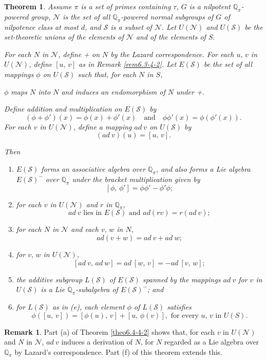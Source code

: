 \documentclass[mathscr]{amsart}
\theoremstyle{theorem}
\newtheorem{theorem}{Theorem}[section]
\theoremstyle{definition}
\newtheorem*{remarknn}{Remark}
\numberwithin{equation}{section}
\def \({\left(}
\def \){\right)}
\def\Q{\mathbb{Q}}
\def\S{\mathcal{S}}
\begin{document}
\begin{theorem}\label{theo6.6}
Assume $\pi$ is a set of primes containing $\tau$, $G$ is a
nilpotent $\Q_\pi$-powered group, $\mathcal{N}$ is the set of all
$\Q_\pi$-powered normal subgroups of $G$ of nilpotence class at most
$d$, and $\S$ is a subset of $\mathcal{N}$. Let $U(\mathcal{N})$ and
$U(\S)$ be the set-theoretic unions of the elements of $\mathcal{N}$
and of the elements of $S.$

For each $N$ in $\mathcal{N}$, define + on $N$ by the Lazard
correspondence. For each $u,\,v$ in $U(\mathcal{N})$, define
$[u,\,v]$ as in Remark \ref{rem6.3-4-2}. Let $E(\S)$ be the set of
all mappings $\phi$ on $U(\S)$ such that, for each $N$ in $S$,

$\phi$ maps $N$ into $N$ and induces an endomorphism of $N$ under +.

Define addition and multiplication on $E(\S)$ by
$$(\phi+\phi')(x)=\phi(x)+\phi'(x)\quad\text{and}\quad
\phi\phi'(x)=\phi(\phi'(x)).$$ For each $v$ in $U(\mathcal{N})$,
define a mapping $ad\ v$ on $U(\S)$ by
$$(ad\ v)(u)=[u,\,v].$$

Then
\begin{enumerate}
\item[(a)] $E(\S)$ forms an associative algebra over $\Q_\pi$, and
also forms a Lie algebra $E(\S)^-$ over $\Q_\pi$ under the bracket
multiplication given by
$$[\phi,\,\phi']=\phi\phi'-\phi'\phi;$$
\item[(b)] for each $v$ in $U(\mathcal{N})$ and $r$ in $\Q_\pi$,
$$ad\ v\text{ lies in }E(\S)\text{ and }ad(rv)=r(ad\ v);$$
\item[(c)] for each $N$ in $\mathcal{N}$ and each $v,\,w$ in $N$,
$$ad(v+w)=ad\ v+ad\ w;$$
\item[(d)] for $v,\,w$ in $U(\mathcal{N})$,
$$[ad\ v,\,ad\ w]=ad\ [w,\,v]=-ad\ [v,\,w];$$
\item[(e)] the additive subgroup $L(\S)$ of $E(\S)$ spanned by the
mappings $ad\ v$ for $v$ in $U(\S)$ is a Lie $\Q_\pi$-subalgebra of
$E(\S)^-$; and
\item[(f)] for $L(\S)$ as in (e), each element $\phi$ of $L(\S)$
satisfies
$$\phi\([u,\,v]\)=[\phi(u),\,v]+[u,\,\phi(v)],\text{ for every $u,\,v$ in }U(S).$$
\end{enumerate}
\end{theorem}

\begin{remarknn}
Part (a) of Theorem \ref{theo6.4-4-2} shows that, for each $v$ in
$U(\mathcal{N})$ and $N$ in $\mathcal{N}$, $ad\ v$ induces a
derivation of $N$, for $N$ regarded as a Lie algebra over $\Q_\pi$
by Lazard's correspondence. Part (f) of this theorem extends this.
\end{remarknn}
\end{document}
